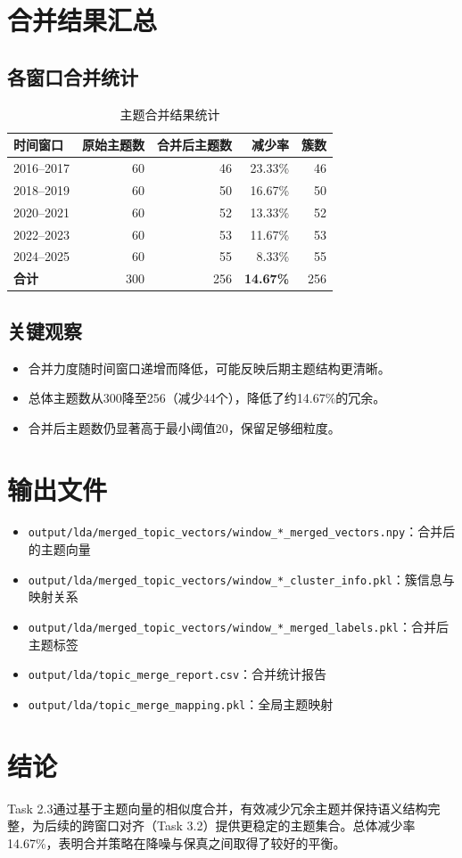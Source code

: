 \documentclass[11pt,a4paper]{article}
\begin{document}
\section{合并结果汇总}

\subsection{各窗口合并统计}

\begin{table}[h]
\centering
\begin{tabular}{lrrrr}
\toprule
\textbf{时间窗口} & \textbf{原始主题数} & \textbf{合并后主题数} & \textbf{减少率} & \textbf{簇数} \\
\midrule
2016--2017 & 60 & 46 & 23.33\% & 46 \\
2018--2019 & 60 & 50 & 16.67\% & 50 \\
2020--2021 & 60 & 52 & 13.33\% & 52 \\
2022--2023 & 60 & 53 & 11.67\% & 53 \\
2024--2025 & 60 & 55 & 8.33\% & 55 \\
\midrule
\textbf{合计} & 300 & 256 & \textbf{14.67\%} & 256 \\
\bottomrule
\end{tabular}
\caption{主题合并结果统计}
\end{table}

\subsection{关键观察}

\begin{itemize}
    \item 合并力度随时间窗口递增而降低，可能反映后期主题结构更清晰。
    \item 总体主题数从300降至256（减少44个），降低了约14.67\%的冗余。
    \item 合并后主题数仍显著高于最小阈值20，保留足够细粒度。
\end{itemize}

\section{输出文件}

\begin{itemize}
    \item \texttt{output/lda/merged\_topic\_vectors/window\_*\_merged\_vectors.npy}：合并后的主题向量
    \item \texttt{output/lda/merged\_topic\_vectors/window\_*\_cluster\_info.pkl}：簇信息与映射关系
    \item \texttt{output/lda/merged\_topic\_vectors/window\_*\_merged\_labels.pkl}：合并后主题标签
    \item \texttt{output/lda/topic\_merge\_report.csv}：合并统计报告
    \item \texttt{output/lda/topic\_merge\_mapping.pkl}：全局主题映射
\end{itemize}

\section{结论}

Task 2.3通过基于主题向量的相似度合并，有效减少冗余主题并保持语义结构完整，为后续的跨窗口对齐（Task 3.2）提供更稳定的主题集合。总体减少率14.67\%，表明合并策略在降噪与保真之间取得了较好的平衡。
\end{document}
